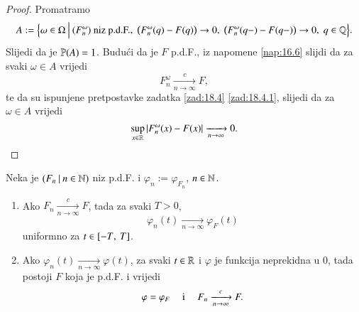 \begin{proof}
    Promatramo
    \begin{equation*}
        A := \Big\{{\omega \in \Omega} \: \Big| \: {(F^\omega_n) \textnormal{ niz p.d.F.}, \; \big(F^\omega_n (q) - F(q) \big) \to 0, \; \big( F^\omega_n (q-) - F(q-) \big) \to 0, \; q \in \mathbb{Q}}\Big\}.
    \end{equation*}
    Slijedi da je $\mathbb{P} (A) = 1$.
    Budu\' ci da je $F$ p.d.F., iz napomene \ref{nap:16.6} slijdi da za svaki $\omega \in A$ vrijedi
    \begin{equation*}
        F^\omega_n \xrightarrow[n \to \infty]{c} F,
    \end{equation*}
    te da su ispunjene pretpostavke zadatka \ref{zad:18.4} \ref{zad:18.4.1}, slijedi da za $\omega \in A$ vrijedi
    \begin{equation*}
        \sup\limits_{x \in \mathbb{R}} |F^\omega_n (x) - F(x)| \xrightarrow[n \to \infty]{} 0.
    \end{equation*}
\end{proof}

\begin{tm}  \label{tm:18.6}
    \quad \newline
    Neka je $({F_n} \: | \: {n \in \mathbb{N}})$ niz p.d.F. i $\varphi_n := \varphi_{F_n}$, $n \in \mathbb{N}$.
    \begin{enumerate}[label=(\roman*)]
        \item   \label{tm:18.6.1}
        Ako $F_n \xrightarrow[n \to \infty]{c} F$, tada za svaki $T > 0$,
        \begin{equation*}
            \varphi_n (t) \xrightarrow[n \to \infty]{} \varphi_F (t)
        \end{equation*}
        uniformno za $t \in [{-T}, \:{T}]$.
        \item   \label{tm:18.6.2}
        Ako $\varphi_n (t) \xrightarrow[n \to \infty]{} \varphi (t)$, za svaki $t \in \mathbb{R}$ i $\varphi$ je funkcija neprekidna u $0$, tada postoji $F$ koja je p.d.F. i vrijedi
        \begin{equation*}
            \varphi = \varphi_F \quad \textnormal{ i } \quad F_n \xrightarrow[n \to \infty]{c} F.
        \end{equation*}
    \end{enumerate}
\end{tm}

